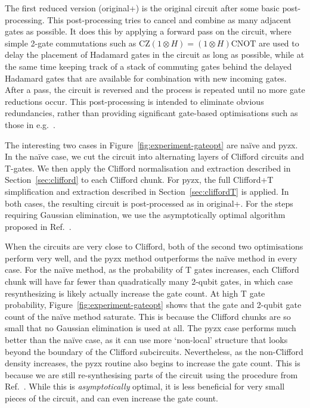 \documentclass[a4paper,onecolumn,superscriptaddress,11pt,accepted=2020-04-27]{quantumarticle}
\theoremstyle{definition}
\begin{document}
The first reduced version (\textsf{original+}) is the original circuit after some basic post-processing. This post-processing tries to cancel and combine as many adjacent gates as possible. It does this by applying a forward pass on the circuit, where simple 2-gate commutations such as $\textrm{CZ}(1 \otimes H) = (1 \otimes H)\textrm{CNOT}$ are used to delay the placement of Hadamard gates in the circuit as long as possible, while at the same time keeping track of a stack of commuting gates behind the delayed Hadamard gates that are available for combination with new incoming gates. After a pass, the circuit is reversed and the process is repeated until no more gate reductions occur. This post-processing is intended to eliminate obvious redundancies, rather than providing significant gate-based optimisations such as those in e.g.~\cite{nam2018automated}.

The interesting two cases in Figure~\ref{fig:experiment-gateopt} are \textsf{na\"ive} and \textsf{pyzx}. In the na\"ive case, we cut the circuit into alternating layers of Clifford circuits and T-gates. We then apply the Clifford normalisation and extraction described in Section~\ref{sec:clifford} to each Clifford chunk. For \textsf{pyzx}, the full Clifford+T simplification and extraction described in Section~\ref{sec:cliffordT} is applied. In both cases, the resulting circuit is post-processed as in \textsf{original+}. For the steps requiring Gaussian elimination, we use the asymptotically optimal algorithm proposed in Ref.~\cite{markov2008optimal}.

When the circuits are very close to Clifford, both of the second two optimisations perform very well, and the \textsf{pyzx} method outperforms the na\"ive method in every case. For the na\"ive method, as the probability of T gates increases, each Clifford chunk will have far fewer than quadratically many 2-qubit gates, in which case %
resynthesizing is likely actually increase the gate count. At high T gate probability, Figure~\ref{fig:experiment-gateopt} shows that the gate and 2-qubit gate count of the na\"ive method saturate. This is because the Clifford chunks are so small that no Gaussian elimination is used at all.
The \textsf{pyzx} case performs much better than the \textsf{na\"ive} case, as it can use more `non-local' structure that looks beyond the boundary of the Clifford subcircuits. Nevertheless, as the non-Clifford density increases, the \textsf{pyzx} routine also begins to increase the gate count. This is because we are still re-synthesising parts of the circuit using the procedure from Ref.~\cite{markov2008optimal}. While this is \textit{asymptotically} optimal, it is less beneficial for very small pieces of the circuit, and can even increase the gate count.
\end{document}

